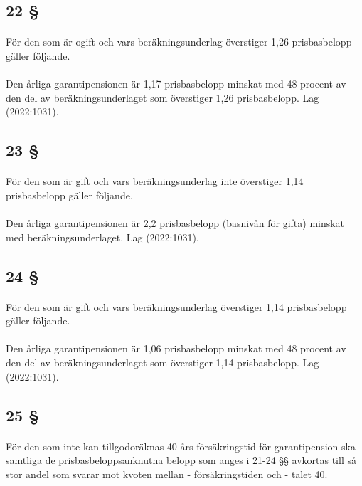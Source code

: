 \documentclass[a4paper,notitlepage,openany,10pt]{book}
\begin{document}
\subsection*{22 §}
\paragraph*{}
För den som är ogift och vars beräkningsunderlag överstiger 1,26 prisbasbelopp gäller följande.
\paragraph*{}
Den årliga garantipensionen är 1,17 prisbasbelopp minskat med 48 procent av den del av beräkningsunderlaget som överstiger 1,26 prisbasbelopp.
Lag (2022:1031).
\subsection*{23 §}
\paragraph*{}
För den som är gift och vars beräkningsunderlag inte överstiger 1,14 prisbasbelopp gäller följande.
\paragraph*{}
Den årliga garantipensionen är 2,2 prisbasbelopp (basnivån för gifta) minskat med beräkningsunderlaget.
Lag (2022:1031).
\subsection*{24 §}
\paragraph*{}
För den som är gift och vars beräkningsunderlag överstiger 1,14 prisbasbelopp gäller följande.
\paragraph*{}
Den årliga garantipensionen är 1,06 prisbasbelopp minskat med 48 procent av den del av beräkningsunderlaget som överstiger 1,14 prisbasbelopp.
Lag (2022:1031).
\subsection*{25 §}
\paragraph*{}
För den som inte kan tillgodoräknas 40 års försäkringstid för garantipension ska samtliga de prisbasbeloppsanknutna belopp som anges i 21-24 §§ avkortas till så stor andel som svarar mot kvoten mellan
\newline - försäkringstiden och
\newline - talet 40.
\end{document}
